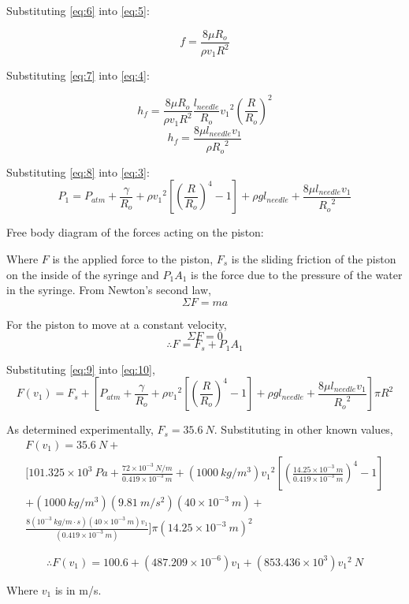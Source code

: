 \documentclass{article}
\begin{document}
Substituting \eqref{eq:6} into \eqref{eq:5}:

\[ f = \frac{8 \mu R_{o}}{\rho v_{1} R^{2}} \tag{7} \label{eq:7} \]

Substituting \eqref{eq:7} into \eqref{eq:4}:

\[ h_{f} = \frac{8 \mu R_{o}}{\rho v_{1} R^{2}} \frac{l_{needle}}{R_{o}} {v_{1}}^2 \left(\frac{R}{R_{o}}\right)^2 \]
\[ h_{f} = \frac{8 \mu l_{needle} v_{1} }{\rho {R_{o}}^2} \tag{8} \label{eq:8} \]

Substituting \eqref{eq:8} into \eqref{eq:3}:
\[ P_{1} = P_{atm} + \frac{\gamma}{R_{o}} + \rho{v_{1}}^2\left[\left(\frac{R}{R_{o}}\right)^4  - 1 \right] + \rho gl_{needle} + \frac{8 \mu l_{needle} v_{1} }{{R_{o}}^2} \tag{9} \label{eq:9} \]

Free body diagram of the forces acting on the piston:

Where $F$ is the applied force to the piston, $F_{s}$ is the sliding friction of the piston on the inside of the syringe and $P_{1}A_{1}$ is the force due to the pressure of the water in the syringe. From Newton's second law,
\[ \Sigma F = ma \]

For the piston to move at a constant velocity,
\[ \Sigma F = 0 \]
\[ \therefore F = F_{s} + P_{1}A_{1} \tag{10} \label{eq:10} \]

Substituting \eqref{eq:9} into \eqref{eq:10},
\[ F(v_{1}) = F_{s} + \left[P_{atm} + \frac{\gamma}{R_{o}} + \rho{v_{1}}^2\left[\left(\frac{R}{R_{o}}\right)^4  - 1 \right] + \rho gl_{needle} + \frac{8 \mu l_{needle} v_{1} }{{R_{o}}^2} \right] \pi R^{2}\]

As determined experimentally, $F_{s} = 35.6 \ N$. Substituting in other known values,
\begin{multline*}
F(v_{1}) = 35.6 \ N + \\ \bigg[ 101.325 \times 10^{3} \ Pa + \frac{72 \times 10^{-3} \ N/m}{0.419 \times 10^{-3} \ m} +\left(1000 \ kg/m^3 \right) {v_{1}}^2 \left[\left(\frac{14.25 \times 10^{-3} \ m}{0.419 \times 10^{-3} \ m}\right)^4  - 1 \right] \\ + \left(1000 \ kg/m^3 \right) \left( 9.81 \ m/s^2 \right) \left( 40 \times 10^{-3} \ m \right) + \\ \frac{8 \left( 10^{-3} \ kg/m \cdot s \right) \left( 40 \times 10^{-3} \ m \right) v_{1}}{\left( 0.419 \times 10^{-3} \ m \right)} \bigg] \pi {\left( 14.25 \times 10^{-3} \ m \right)}^{2}
\end{multline*}

\[ \therefore F(v_{1}) = 100.6 + (487.209 \times 10^{-6}) v_{1} + (853.436 \times 10^{3}) {v_{1}}^2 \ N \]

Where $v_{1}$ is in m/s.
\end{document}
